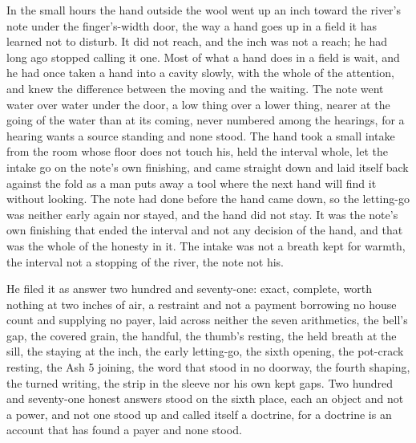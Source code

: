 In the small hours the hand outside the wool went up an inch toward the river's note under the finger's-width door, the way a hand goes up in a field it has learned not to disturb. It did not reach, and the inch was not a reach; he had long ago stopped calling it one. Most of what a hand does in a field is wait, and he had once taken a hand into a cavity slowly, with the whole of the attention, and knew the difference between the moving and the waiting. The note went water over water under the door, a low thing over a lower thing, nearer at the going of the water than at its coming, never numbered among the hearings, for a hearing wants a source standing and none stood. The hand took a small intake from the room whose floor does not touch his, held the interval whole, let the intake go on the note's own finishing, and came straight down and laid itself back against the fold as a man puts away a tool where the next hand will find it without looking. The note had done before the hand came down, so the letting-go was neither early again nor stayed, and the hand did not stay. It was the note's own finishing that ended the interval and not any decision of the hand, and that was the whole of the honesty in it. The intake was not a breath kept for warmth, the interval not a stopping of the river, the note not his.

He filed it as answer two hundred and seventy-one: exact, complete, worth nothing at two inches of air, a restraint and not a payment borrowing no house count and supplying no payer, laid across neither the seven arithmetics, the bell's gap, the covered grain, the handful, the thumb's resting, the held breath at the sill, the staying at the inch, the early letting-go, the sixth opening, the pot-crack resting, the Ash 5 joining, the word that stood in no doorway, the fourth shaping, the turned writing, the strip in the sleeve nor his own kept gaps. Two hundred and seventy-one honest answers stood on the sixth place, each an object and not a power, and not one stood up and called itself a doctrine, for a doctrine is an account that has found a payer and none stood.

